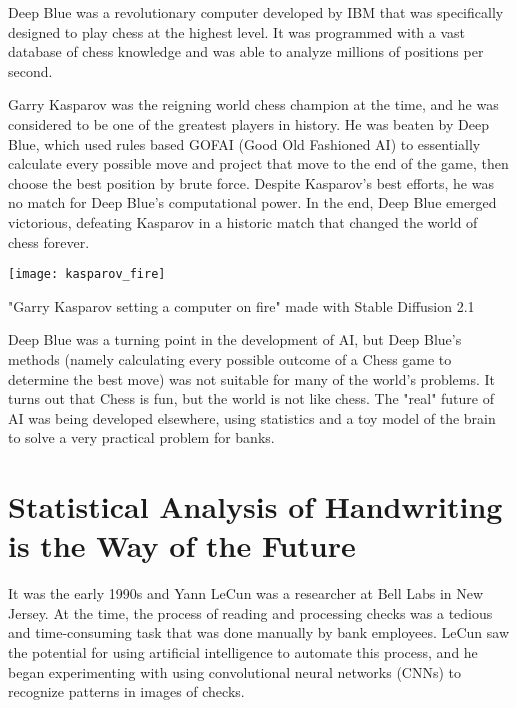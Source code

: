 Deep Blue was a revolutionary computer developed by IBM that was specifically designed to play chess at the highest level. It was programmed with a vast database of chess knowledge and was able to analyze millions of positions per second.

Garry Kasparov was the reigning world chess champion at the time, and he was considered to be one of the greatest players in history. He was beaten by Deep Blue, which used rules based GOFAI (Good Old Fashioned AI) to essentially calculate every possible move and project that move to the end of the game, then choose the best position by brute force. Despite Kasparov's best efforts, he was no match for Deep Blue's computational power. In the end, Deep Blue emerged victorious, defeating Kasparov in a historic match that changed the world of chess forever.

\begin{marginfigure}[-5.5cm]
        \texttt{[image: kasparov\_fire]}
	\caption{"Garry Kasparov setting a computer on fire" made with Stable Diffusion 2.1}
\end{marginfigure}

Deep Blue was a turning point in the development of AI, but Deep Blue's methods (namely calculating every possible outcome of a Chess game to determine the best move) was not suitable for many of the world's problems. It turns out that Chess is fun, but the world is not like chess. The "real" future of AI was being developed elsewhere, using statistics and a toy model of the brain to solve a very practical problem for banks.

\section{Statistical Analysis of Handwriting is the Way of the Future}

It was the early 1990s and Yann LeCun was a researcher at Bell Labs in New Jersey. At the time, the process of reading and processing checks was a tedious and time-consuming task that was done manually by bank employees. LeCun saw the potential for using artificial intelligence to automate this process, and he began experimenting with using convolutional neural networks (CNNs) to recognize patterns in images of checks.

